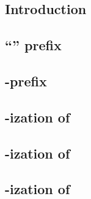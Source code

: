 \subsection{Introduction}                        \label{rlp auth: rlp utils calls: intro}    
\subsection{``\locMagicByte'' prefix}            \label{rlp auth: rlp utils calls: magic}    
\subsection{\rlp{}-prefix}                       \label{rlp auth: rlp utils calls: prefix}   
\subsection{\rlp{}-ization of \locChainId{}}     \label{rlp auth: rlp utils calls: chain id} 
\subsection{\rlp{}-ization of \locAddress{}}     \label{rlp auth: rlp utils calls: address}  
\subsection{\rlp{}-ization of \locNonce{}}       \label{rlp auth: rlp utils calls: nonce}    
